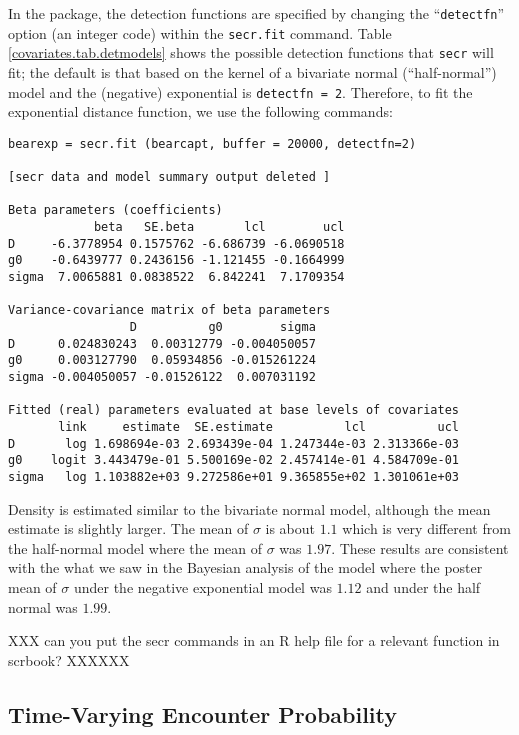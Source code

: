 In the \secr package, the detection functions are specified
by changing the ``\mbox{\tt detectfn}'' option (an integer code)
within the \mbox{\tt secr.fit} command.  Table
\ref{covariates.tab.detmodels} shows the possible detection functions
that \mbox{\tt secr} will fit; the default is that based on the kernel
of a bivariate normal 
(``half-normal'') model and the
(negative) exponential is \mbox{\tt detectfn = 2}. Therefore, to fit the
exponential distance function, we use the following commands:

{\small
\begin{verbatim}
bearexp = secr.fit (bearcapt, buffer = 20000, detectfn=2)

[secr data and model summary output deleted ]

Beta parameters (coefficients) 
            beta   SE.beta       lcl        ucl
D     -6.3778954 0.1575762 -6.686739 -6.0690518
g0    -0.6439777 0.2436156 -1.121455 -0.1664999
sigma  7.0065881 0.0838522  6.842241  7.1709354

Variance-covariance matrix of beta parameters 
                 D          g0        sigma
D      0.024830243  0.00312779 -0.004050057
g0     0.003127790  0.05934856 -0.015261224
sigma -0.004050057 -0.01526122  0.007031192

Fitted (real) parameters evaluated at base levels of covariates 
       link     estimate  SE.estimate          lcl          ucl
D       log 1.698694e-03 2.693439e-04 1.247344e-03 2.313366e-03
g0    logit 3.443479e-01 5.500169e-02 2.457414e-01 4.584709e-01
sigma   log 1.103882e+03 9.272586e+01 9.365855e+02 1.301061e+03
\end{verbatim}
}

Density is estimated similar to the bivariate normal model, 
although the mean
estimate is slightly larger. The 
mean of 
$\sigma$ is about $1.1$
 which is very different from the half-normal model where the
 mean of $\sigma$ was $1.97$.
These results are consistent with the what we saw in the Bayesian
analysis of the model where the poster mean of $\sigma$ under the negative
exponential model was $1.12$ and under the half normal was $1.99$. 


XXX can you put the secr commands in an R help file for a relevant
function in scrbook? XXXXXX


\subsection{Time-Varying Encounter Probability}

